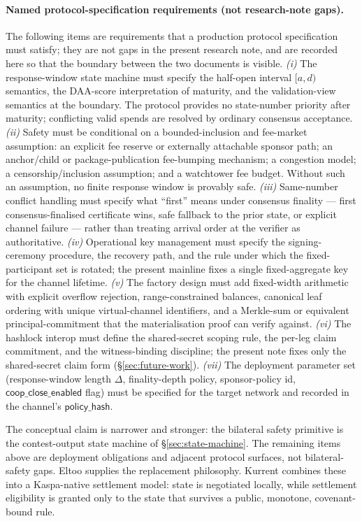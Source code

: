 \documentclass[10pt,a4paper]{article}
\begin{document}
\paragraph{Named protocol-specification requirements (not research-note gaps).} The following items are requirements that a production protocol specification must satisfy; they are not gaps in the present research note, and are recorded here so that the boundary between the two documents is visible. \emph{(i)} The response-window state machine must specify the half-open interval $[a, d)$ semantics, the DAA-score interpretation of maturity, and the validation-view semantics at the boundary. The protocol provides no state-number priority after maturity; conflicting valid spends are resolved by ordinary consensus acceptance. \emph{(ii)} Safety must be conditional on a bounded-inclusion and fee-market assumption: an explicit fee reserve or externally attachable sponsor path; an anchor/child or package-publication fee-bumping mechanism; a congestion model; a censorship/inclusion assumption; and a watchtower fee budget. Without such an assumption, no finite response window is provably safe. \emph{(iii)} Same-number conflict handling must specify what ``first'' means under consensus finality --- first consensus-finalised certificate wins, safe fallback to the prior state, or explicit channel failure --- rather than treating arrival order at the verifier as authoritative. \emph{(iv)} Operational key management must specify the signing-ceremony procedure, the recovery path, and the rule under which the fixed-participant set is rotated; the present mainline fixes a single fixed-aggregate key for the channel lifetime. \emph{(v)} The factory design must add fixed-width arithmetic with explicit overflow rejection, range-constrained balances, canonical leaf ordering with unique virtual-channel identifiers, and a Merkle-sum or equivalent principal-commitment that the materialisation proof can verify against. \emph{(vi)} The hashlock interop must define the shared-secret scoping rule, the per-leg claim commitment, and the witness-binding discipline; the present note fixes only the shared-secret claim form (§\ref{sec:future-work}). \emph{(vii)} The deployment parameter set (response-window length $\Delta$, finality-depth policy, sponsor-policy id, $\mathsf{coop\_close\_enabled}$ flag) must be specified for the target network and recorded in the channel's $\mathsf{policy\_hash}$.

The conceptual claim is narrower and stronger: the bilateral safety primitive is the contest-output state machine of §\ref{sec:state-machine}. The remaining items above are deployment obligations and adjacent protocol surfaces, not bilateral-safety gaps. Eltoo supplies the replacement philosophy. Kurrent combines these into a Kaspa-native settlement model: state is negotiated locally, while settlement eligibility is granted only to the state that survives a public, monotone, covenant-bound rule.
\end{document}
